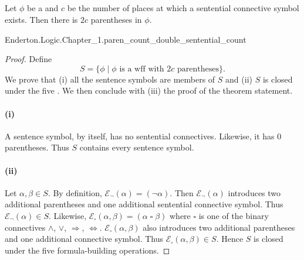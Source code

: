 \documentclass{report}
\begin{document}
\subsection{}%

  \begin{lemma}
    Let $\phi$ be a  and $c$ be the number of
      places at which a sentential connective symbol exists.
    Then there is $2c$ parentheses in $\phi$.
  \end{lemma}

    {Enderton.Logic.Chapter\_1.paren\_count\_double\_sentential\_count}

  \begin{proof}

    Define $$S = \{ \phi \mid
      \phi \text{ is a wff with } 2c \text{ parentheses} \}.$$
    We prove that (i) all the sentence symbols are members of $S$ and (ii)
      $S$ is closed under the five .
    We then conclude with (iii) the proof of the theorem statement.

    \paragraph{(i)}%

      A sentence symbol, by itself, has no sentential connectives.
      Likewise, it has 0 parentheses.
      Thus $S$ contains every sentence symbol.

    \paragraph{(ii)}%

      Let $\alpha, \beta \in S$.
      By definition, $\mathcal{E}_{\neg}(\alpha) = (\neg \alpha)$.
      Then $\mathcal{E}_{\neg}(\alpha)$ introduces two additional parentheses
         and one additional sentential connective symbol.
      Thus $\mathcal{E}_{\neg}(\alpha) \in S$.
      Likewise,
        $\mathcal{E}_{\square}(\alpha, \beta) = (\alpha \mathop{\square} \beta)$
        where $\square$ is one of the binary connectives $\land$, $\lor$,
          $\Rightarrow$, $\Leftrightarrow$.
      $\mathcal{E}_{\square}(\alpha, \beta)$ also introduces two additional
        parentheses and one additional connective symbol.
      Thus $\mathcal{E}_{\square}(\alpha, \beta) \in S$.
      Hence $S$ is closed under the five formula-building operations.


\end{proof}
\end{document}
